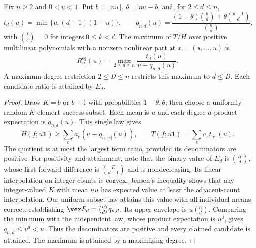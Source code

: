 \begin{theorem}\label{thm:equal-finite}
Fix $n\ge2$ and $0<u<1$. Put $b=\lfloor nu\rfloor$,
$\theta=nu-b$, and, for $2\le d\le n$,
\[
 t_d(u)=\min\{u,(d-1)(1-u)\},\qquad
 q_{n,d}(u)=\frac{(1-\theta)\binom bd+\theta\binom{b+1}d}{\binom nd},
\]
with $\binom{k}{d}=0$ for integers $0\le k<d$. The maximum of $T/H$
over positive multilinear polynomials with a nonzero nonlinear part at
$x=(u,\ldots,u)$ is
\begin{equation}\label{eq:equal-finite}
 R_n^{\mathrm{eq}}(u)=\max_{2\le d\le n}
                \frac{t_d(u)}{u-q_{n,d}(u)}.
\end{equation}
A maximum-degree restriction $2\le D\le n$ restricts this maximum to
$d\le D$. Each candidate ratio is attained by $E_d$.
\end{theorem}
\begin{proof}
Draw $K=b$ or $b+1$ with probabilities $1-\theta,\theta$, then choose
a uniformly random $K$-element success subset. Each mean is $u$ and
each degree-$d$ product expectation is $q_{n,d}(u)$. This single law gives
\[
 H(f;u\boldsymbol1)\ge\sum_ea_e(u-q_{n,|e|}(u)),\qquad
 T(f;u\boldsymbol1)=\sum_ea_et_{|e|}(u).
\]
The quotient is at most the largest term ratio, provided its denominators
are positive. For positivity and attainment, note that the binary
value of $E_d$ is $\binom Kd$, whose first forward difference is
$\binom K{d-1}$ and is nondecreasing. Its linear interpolation on integer
counts is convex. Jensen's inequality shows that any integer-valued $K$
with mean $nu$ has expected value at least the adjacent-count
interpolation. Our uniform-subset law attains this value with all
individual means correct, establishing $\vex E_d=\binom nd q_{n,d}$.
Its upper envelope is $u\binom nd$. Comparing the minimum with the
independent law, whose product expectation is $u^d$, gives
$q_{n,d}\le u^d<u$. Thus the denominators are positive and every claimed
candidate is attained. The maximum is attained by a maximizing degree.
\end{proof}

